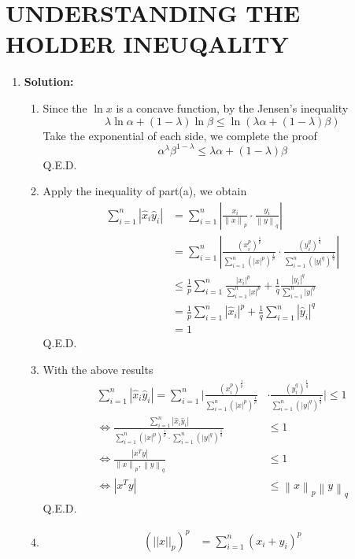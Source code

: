 \section{UNDERSTANDING THE HOLDER INEUQALITY}

\begin{enumerate}
	\item \textbf{Solution:}
	\begin{enumerate}
		\item Since the $\ln x$ is a concave function, by the Jensen's inequality
		$$\lambda \ln\alpha +(1-\lambda)\ln \beta\le \ln(\lambda \alpha+(1-\lambda)\beta)$$
		Take the exponential of each side, we complete the proof
		$$\alpha^\lambda\beta^{1-\lambda}\le \lambda\alpha+(1-\lambda)\beta$$
		Q.E.D.
		\item Apply the inequality of part(a), we obtain
		\begin{align*}
		\sum_{i=1}^{n}|\hat{x}_i\hat{y}_i|&=\sum_{i=1}^{n}|\frac{x_i}{\left\|x\right\|_p}\cdot \frac{y_i}{	\left\|y\right\|_q}|\\
		&=\sum_{i=1}^{n} |\frac{(x_i^p)^{\frac{1}{p}}}{\sum_{i=1}^{n}(|x|^p)^{\frac{1}{p}}}\cdot \frac{(y_i^q)^{\frac{1}{q}}}{\sum_{i=1}^{n}(|y|^q)^{\frac{1}{q}}}|\\
		&\le \frac{1}{p} \sum_{i=1}^{n}\frac{|x_i|^p}{\sum_{i=1}^{n}|x|^p} + \frac{1}{q}\frac{|y_i|^q}{\sum_{i=1}^{n}|y|^q}\\
		&=\frac{1}{p} \sum_{i=1}^{n} |\hat{x}_i|^p+\frac{1}{q} \sum_{i=1}^{n} |\hat{y}_i|^q\\
		&=1
		\end{align*}
		Q.E.D.
		\item With the above results
		\begin{align*}
		\sum_{i=1}^{n}|\hat{x}_i\hat{y}_i| =\sum_{i=1}^{n} |\frac{(x_i^p)^{\frac{1}{p}}}{\sum_{i=1}^{n}(|x|^p)^{\frac{1}{p}}}&\cdot \frac{(y_i^q)^{\frac{1}{q}}}{\sum_{i=1}^{n}(|y|^q)^{\frac{1}{q}}}|\le 1\\
		\Leftrightarrow  \frac{\sum_{i=1}^{n}|\hat{x}_i\hat{y}_i|}{\sum_{i=1}^{n}(|x|^p)^{\frac{1}{p}} \cdot \sum_{i=1}^{n}(|y|^q)^{\frac{1}{q}}}&\le 1\\
		\Leftrightarrow \frac{|x^Ty|}{\left\|x\right\|_p,\left\|y\right\|_q}&\le 1\\
		\Leftrightarrow |x^Ty|&\le \left\|x\right\|_p\left\|y\right\|_q
		\end{align*}
		Q.E.D.
		\item 
		\begin{align*}
		(||x||_p)^p&=\sum_{i=1}^n (x_i+y_i)^p\\

\end{align*}
\end{enumerate}
\end{enumerate}
